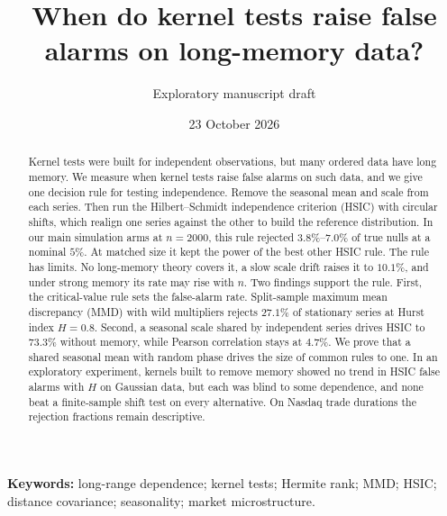 \documentclass[11pt]{article}
\title{When do kernel tests raise false alarms on long-memory data?}
\author{Exploratory manuscript draft}
\date{23 October 2026}
\theoremstyle{remark}
\begin{document}
\maketitle

\begin{abstract}
Kernel tests were built for independent observations, but many ordered data have long memory. We measure when kernel tests raise false alarms on such data, and we give one decision rule for testing independence. Remove the seasonal mean and scale from each series. Then run the Hilbert--Schmidt independence criterion (HSIC) with circular shifts, which realign one series against the other to build the reference distribution. In our main simulation arms at $n=2000$, this rule rejected $3.8\%$--$7.0\%$ of true nulls at a nominal $5\%$. At matched size it kept the power of the best other HSIC rule. The rule has limits. No long-memory theory covers it, a slow scale drift raises it to $10.1\%$, and under strong memory its rate may rise with $n$. Two findings support the rule. First, the critical-value rule sets the false-alarm rate. Split-sample maximum mean discrepancy (MMD) with wild multipliers rejects $27.1\%$ of stationary series at Hurst index $H=0.8$. Second, a seasonal scale shared by independent series drives HSIC to $73.3\%$ without memory, while Pearson correlation stays at $4.7\%$. We prove that a shared seasonal mean with random phase drives the size of common rules to one. In an exploratory experiment, kernels built to remove memory showed no trend in HSIC false alarms with $H$ on Gaussian data, but each was blind to some dependence, and none beat a finite-sample shift test on every alternative. On Nasdaq trade durations the rejection fractions remain descriptive.
\end{abstract}

\noindent\textbf{Keywords:} long-range dependence; kernel tests; Hermite rank; MMD; HSIC; distance covariance; seasonality; market microstructure.
\end{document}
